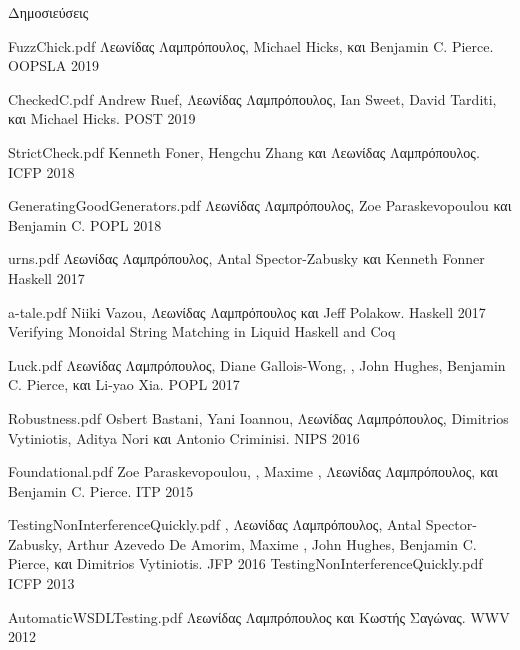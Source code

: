 \documentclass{resume} %
\begin{document}
\begin{rSection}{\textgreek{Δημοσιεύσεις}}

    {FuzzChick.pdf}
    {\textgreek{Λεωνίδας Λαμπρόπουλος}, Michael Hicks, \textgreek{και} Benjamin C. Pierce.}
    {OOPSLA 2019}
    
    {CheckedC.pdf}
    {Andrew Ruef, \textgreek{Λεωνίδας Λαμπρόπουλος}, Ian Sweet, David Tarditi, \textgreek{και} Michael Hicks.}
    {POST 2019}

    {StrictCheck.pdf}
    {Kenneth Foner, Hengchu Zhang \textgreek{και} \textgreek{Λεωνίδας Λαμπρόπουλος}.}
    {ICFP 2018}

    {GeneratingGoodGenerators.pdf}
    {\textgreek{Λεωνίδας Λαμπρόπουλος}, Zoe Paraskevopoulou \textgreek{και} Benjamin C.}
    {POPL 2018}

    {urns.pdf}
    {\textgreek{Λεωνίδας Λαμπρόπουλος}, Antal Spector-Zabusky \textgreek{και} Kenneth Fonner}
    {Haskell 2017}

    {a-tale.pdf}
    {Niiki Vazou, \textgreek{Λεωνίδας Λαμπρόπουλος} \textgreek{και} Jeff Polakow.}
    {Haskell 2017}
    {Verifying Monoidal String Matching in Liquid Haskell and Coq}

    {Luck.pdf}
    {\textgreek{Λεωνίδας Λαμπρόπουλος}, Diane Gallois-Wong, \Catalin \Hritcu, John Hughes, Benjamin C. Pierce, \textgreek{και} Li-yao Xia.}
    {POPL 2017}

    {Robustness.pdf}
    {Osbert Bastani, Yani Ioannou, \textgreek{Λεωνίδας Λαμπρόπουλος}, Dimitrios Vytiniotis, Aditya Nori \textgreek{και} Antonio Criminisi.}
    {NIPS 2016}

    {Foundational.pdf}
    {Zoe Paraskevopoulou, \Catalin \Hritcu, Maxime \Denes, \textgreek{Λεωνίδας Λαμπρόπουλος}, \textgreek{και} Benjamin C. Pierce.}
    {ITP 2015}
    
    {TestingNonInterferenceQuickly.pdf}
    {\Catalin \Hritcu, \textgreek{Λεωνίδας Λαμπρόπουλος}, Antal Spector-Zabusky, Arthur
    Azevedo De Amorim, Maxime \Denes, John Hughes, Benjamin C. Pierce, \textgreek{και} Dimitrios
    Vytiniotis.}
    {JFP 2016}
    {TestingNonInterferenceQuickly.pdf}
    {ICFP 2013}
%

    {AutomaticWSDLTesting.pdf}
    {\textgreek{Λεωνίδας Λαμπρόπουλος} \textgreek{και Κωστής Σαγώνας}.}
    {WWV 2012}
   
\end{rSection}
\end{document}
